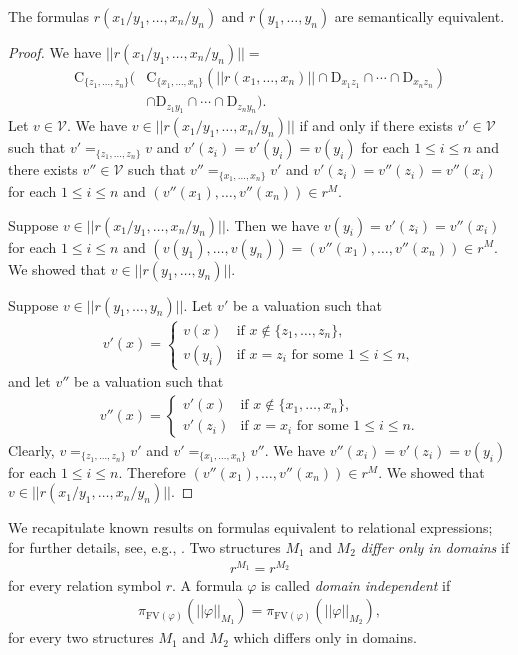\documentclass{lmcs}
\def\tu#1{( #1)}
\def\C{\textrm{C}}
\def\D{\textrm{D}}
\def\V{\mathcal V}
\def\FV{\textrm{FV}}
\begin{document}
\begin{lem}\label{lem:rename}
The formulas  $r(x_1/y_1,\ldots,x_n/y_n)$ and $r(y_1,\ldots,y_n)$ are semantically equivalent. 
\end{lem}
\begin{proof}
We have  $||r(x_1/y_1,\ldots,x_n/y_n)||=$
\begin{align*}
\C_{\{z_1,\ldots,z_n\}}(&\C_{\{x_1,\ldots,x_n\}}(||r(x_1,\ldots,x_n)||\cap\D_{x_1z_1}\cap\cdots\cap\D_{x_nz_n}) \\
&\cap\D_{z_1y_1}\cap\cdots\cap\D_{z_ny_n}).
\end{align*}
Let $v\in\V$. We have $v\in||r(x_1/y_1,\ldots,x_n/y_n)||$ if and only if there exists $v'\in\V$ such that $v'=_{\{z_1,\ldots,z_n\}}v$ and $v'(z_i)=v'(y_i)=v(y_i)$ for each $1\leq i\leq n$ and there exists $v''\in\V$ such that $v''=_{\{x_1,\ldots,x_n\}}v'$ and $v'(z_i)=v''(z_i)=v''(x_i)$ for each $1\leq i\leq n$ and $\tu{v''(x_1),\ldots,v''(x_n)}\in r^M$. 

Suppose $v\in||r(x_1/y_1,\ldots,x_n/y_n)||$. Then we have $v(y_i)=v'(z_i)=v''(x_i)$ for each $1\leq i\leq n$ and $\tu{v(y_1),\ldots,v(y_n)}=\tu{v''(x_1),\ldots,v''(x_n)}\in r^M$. We showed that $v\in||r(y_1,\ldots,y_n)||$.

Suppose $v\in||r(y_1,\ldots,y_n)||$. Let $v'$ be a valuation such that
\begin{align*}
v'(x)=
\begin{cases}
   v(x) & \mbox{if } x\notin\{z_1,\ldots,z_n\},\\
    v(y_i) & \mbox{if } x=z_i \mbox{ for some }1\leq i\leq n,
\end{cases} 
\end{align*}
and let $v''$ be a valuation such that
\begin{align*}
v''(x)=
\begin{cases}
   v'(x) & \mbox{if } x\notin\{x_1,\ldots,x_n\},\\
    v'(z_i) & \mbox{if } x=x_i \mbox{ for some }1\leq i\leq n.
\end{cases} 
\end{align*} 
Clearly, $v=_{\{z_1,\ldots,z_n\}}v'$ and $v'=_{\{x_1,\ldots,x_n\}}v''$. We have $v''(x_i)=v'(z_i)=v(y_i)$ for each $1\leq i\leq n$.  Therefore $\tu{v''(x_1),\ldots,v''(x_n)}\in r^M$. We showed that $v\in||r(x_1/y_1,\ldots,x_n/y_n)||$.
\end{proof}


We recapitulate known results on formulas equivalent to relational expressions; 
for further details, see, e.g., \cite{book:alice}. Two structures $M_1$ and $M_2$ \emph{differ only in domains} if 
\begin{align}
r^{M_1}=r^{M_2} 
\end{align}
for every relation symbol $r$. A formula $\varphi$ is called \emph{domain independent}  if 
\begin{align}
\pi_{\FV(\varphi)}(||\varphi||_{M_1})=\pi_{\FV(\varphi)}(||\varphi||_{M_2}),
\end{align}
for every two structures $M_1$ and $M_2$ which differs only in domains.
\end{document}
